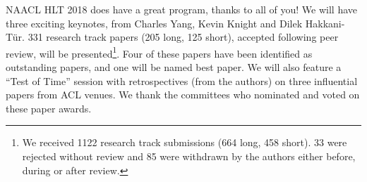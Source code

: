 NAACL HLT 2018 does have a great program, thanks to all of you! 
We will have three exciting keynotes, from Charles Yang, Kevin Knight and Dilek Hakkani-T\"ur. 
331 research track papers (205 long, 125 short), accepted following peer review, will be presented\footnote{We received 1122 research track submissions (664 long, 458 short). 33 were rejected without review and 85 were withdrawn by the authors either before, during or after review.}. Four of these papers have been identified as outstanding papers, and one will be named best paper. 
We will also feature a ``Test of Time'' session with retrospectives (from the authors) on three influential papers from ACL venues. We thank the committees who nominated and voted on these paper awards.
